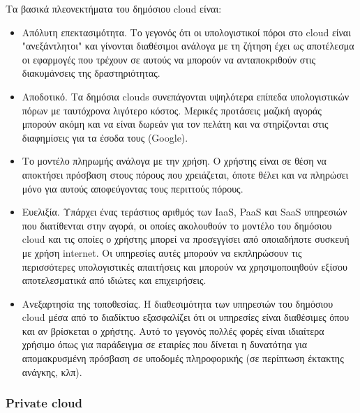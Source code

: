 			Τα βασικά πλεονεκτήματα του δημόσιου cloud είναι:
			\begin{itemize}

			\item Απόλυτη επεκτασιμότητα. Το γεγονός ότι οι υπολογιστικοί πόροι στο cloud είναι "ανεξάντλητοι" και γίνονται διαθέσιμοι ανάλογα με τη ζήτηση έχει ως αποτέλεσμα οι εφαρμογές που τρέχουν σε αυτούς να μπορούν να ανταποκριθούν στις διακυμάνσεις της δραστηριότητας.
			
			\item Αποδοτικό. Τα δημόσια clouds συνεπάγονται υψηλότερα επίπεδα υπολογιστικών πόρων με ταυτόχρονα λιγότερο κόστος. Μερικές προτάσεις μαζική αγοράς μπορούν ακόμη και να είναι δωρεάν για τον πελάτη και να στηρίζονται στις διαφημίσεις για τα έσοδα τους (Google).
			
			\item Το μοντέλο πληρωμής ανάλογα με την χρήση. Ο χρήστης είναι σε θέση να αποκτήσει πρόσβαση στους πόρους που χρειάζεται, όποτε θέλει και να πληρώσει μόνο για αυτούς αποφεύγοντας τους περιττούς πόρους.

			\item 	Ευελιξία. Υπάρχει ένας τεράστιος αριθμός των IaaS, PaaS και SaaS υπηρεσιών που διατίθενται στην αγορά, οι οποίες ακολουθούν το μοντέλο του δημόσιου cloud και τις οποίες ο χρήστης μπορεί να προσεγγίσει από οποιαδήποτε συσκευή με χρήση internet. Οι υπηρεσίες αυτές μπορούν να εκπληρώσουν τις περισσότερες υπολογιστικές απαιτήσεις και μπορούν να χρησιμοποιηθούν εξίσου αποτελεσματικά  από ιδιώτες και επιχειρήσεις. 
			
			\item Ανεξαρτησία της τοποθεσίας. Η διαθεσιμότητα των υπηρεσιών του δημόσιου cloud μέσα από το διαδίκτυο εξασφαλίζει ότι οι υπηρεσίες είναι διαθέσιμες όπου και αν βρίσκεται ο χρήστης. Αυτό το γεγονός πολλές φορές είναι ιδιαίτερα χρήσιμο όπως για παράδειγμα σε εταιρίες που δίνεται η δυνατότηα για απομακρυσμένη πρόσβαση σε υποδομές πληροφορικής (σε περίπτωση έκτακτης ανάγκης, κλπ).
			
		\end{itemize}
			
			
	\subsubsection{Private cloud}


